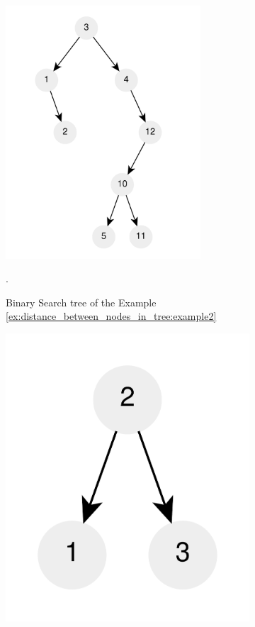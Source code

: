 \begin{figure}
	\centering
	\begin{subfigure}[b]{0.5\textwidth}
		\centering
		\includegraphics[width=0.8\textwidth]{sources/distance_between_nodes_in_tree/images/example2}
		\caption{Binary Search tree of the Example
		\ref{ex:distance_between_nodes_in_tree:example2}}.
		\label{fig:distance_between_nodes_in_tree:example2}
	\end{subfigure}
	\hfill
	\begin{subfigure}[b]{0.3\textwidth}
		\centering
		\includegraphics[width=\textwidth]{sources/distance_between_nodes_in_tree/images/example1}

\end{subfigure}
\end{figure}
